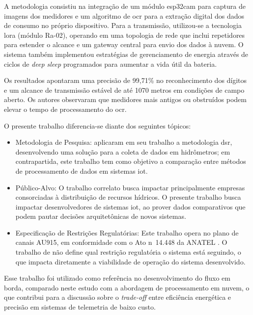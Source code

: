 A metodologia consistiu na integração de um módulo \gls{esp32cam} para captura de 
imagens dos medidores e um algoritmo de \gls{ocr} 
para a extração digital dos dados de consumo no próprio dispositivo. 
Para a transmissão, utilizou-se a tecnologia \gls{lora} (módulo Ra-02), 
operando em uma topologia de rede que inclui repetidores para estender 
o alcance e um gateway central para envio dos dados à nuvem. 
O sistema também implementou estratégias de gerenciamento de energia através 
de ciclos de \textit{deep sleep} programados para aumentar a vida útil da bateria.

Os resultados apontaram uma precisão de 99,71\% no reconhecimento 
dos dígitos e um alcance de transmissão estável de até 1070 metros em condições de campo aberto. 
Os autores observaram que medidores mais antigos ou obstruídos podem elevar o tempo de processamento do \gls{ocr}.

O presente trabalho diferencia-se diante dos seguintes tópicos:

\begin{itemize}
	\item Metodologia de Pesquisa:  aplicaram em seu trabalho a metodologia \gls{dsr},
    desenvolvendo uma solução para a coleta de dados em hidrômetros;
    em contrapartida, este trabalho tem como objetivo a comparação entre métodos
    de processamento de dados em sistemas \gls{iot}.

    \item Público-Alvo: O trabalho correlato busca impactar principalmente empresas consorciadas à
    distribuição de recursos hídricos. O presente trabalho busca impactar desenvolvedores de sistemas \gls{iot},
    ao prover dados comparativos que podem pautar decisões arquitetônicas de novos sistemas.

    \item Especificação de Restrições Regulatórias: Este trabalho opera no plano de canais AU915,
    em conformidade com o Ato n\textordmasculine~14.448 da ANATEL \cite{anatel2017}. O trabalho de 
    não define qual restrição regulatória o sistema está seguindo,
    o que impacta diretamente a viabilidade de operação do sistema desenvolvido.
\end{itemize}

Esse trabalho foi utilizado como referência no desenvolvimento do fluxo em borda,
comparado neste estudo com a abordagem de processamento em nuvem,
o que contribui para a discussão sobre o \textit{trade-off} entre eficiência
energética e precisão em sistemas de telemetria de baixo custo.
